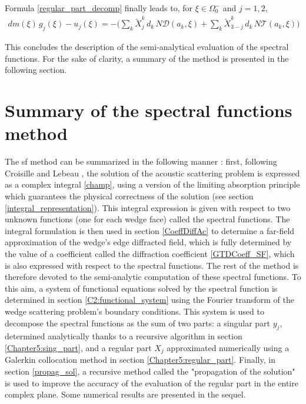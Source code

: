 Formula \eqref{regular_part_decomp} finally leads to, for $\xi \in \Omega_0^-$ and $j=1,2$,
\begin{eqnarray}
dm(\xi)\, g_j(\xi) -  u_j(\xi)=
-\Big( \sum_k \tilde X_j^{k}\, d_k \, N\mathcal D(a_k,\xi)+\sum_k \tilde X_{3-j}^{k} \, d_k \,
N\mathcal T(a_k,\xi) \Big)
\end{eqnarray}

This concludes the description of the semi-analytical evaluation of the spectral functions. For the sake of clarity, a summary of the method is presented in the following section.

\section{Summary of the spectral functions method}
\label{C2:summary}
\hspace*{1em}The \acrfull{sf} method can be summarized in the following manner : first, following Croisille and Lebeau \cite{CroisilleLebeau}, the solution of the acoustic scattering problem is expressed as a complex integral \eqref{champ}, using a version of the limiting absorption principle which guarantees the physical correctness of the solution (see section \ref{integral_representation}). This integral expression is given with respect to two unknown functions (one for each wedge face) called the spectral functions. The integral formulation is then used in section \ref{CoeffDiffAc} to determine a far-field approximation of the wedge's edge diffracted field, which is fully determined by the value of a coefficient called the diffraction coefficient \eqref{GTDCoeff_SF}, which is also expressed with respect to the spectral functions. The rest of the method is therefore devoted to the semi-analytic computation of these spectral functions. To this aim, a system of functional equations solved by the spectral function is determined in section \ref{C2:functional_system} using the Fourier transform of the wedge scattering problem's boundary conditions. This system is used to decompose the spectral functions as the sum of two parts: a singular part $y_j$, determined analytically thanks to a recursive algorithm in section \ref{Chapter5:sing_part}, and a regular part $X_j$ approximated numerically using a Galerkin collocation method in section \ref{Chapter5:regular_part}. Finally, in section \ref{propag_sol}, a recursive method called the "propagation of the solution" is used to improve the accuracy of the evaluation of the regular part in the entire complex plane. Some numerical results are presented in the sequel.


